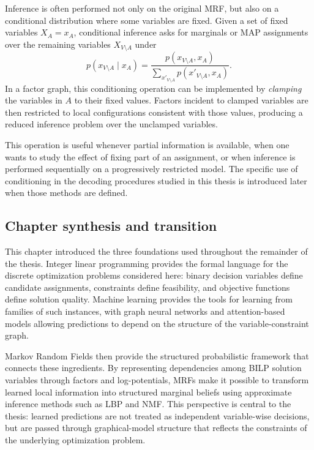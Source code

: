 Inference is often performed not only on the original MRF, but also on a conditional distribution where some variables are fixed. Given a set of fixed variables $X_A=x_A$, conditional inference asks for marginals or MAP assignments over the remaining variables $X_{V\setminus A}$ under
\begin{equation}
p(x_{V\setminus A}\mid x_A)
=
\frac{p(x_{V\setminus A},x_A)}
{\sum_{x'_{V\setminus A}}p(x'_{V\setminus A},x_A)}.
\end{equation}
In a factor graph, this conditioning operation can be implemented by \emph{clamping} the variables in $A$ to their fixed values. Factors incident to clamped variables are then restricted to local configurations consistent with those values, producing a reduced inference problem over the unclamped variables.

This operation is useful whenever partial information is available, when one wants to study the effect of fixing part of an assignment, or when inference is performed sequentially on a progressively restricted model. The specific use of conditioning in the decoding procedures studied in this thesis is introduced later when those methods are defined.

\subsection{Chapter synthesis and transition}

This chapter introduced the three foundations used throughout the remainder of the thesis. Integer linear programming provides the formal language for the discrete optimization problems considered here: binary decision variables define candidate assignments, constraints define feasibility, and objective functions define solution quality. Machine learning provides the tools for learning from families of such instances, with graph neural networks and attention-based models allowing predictions to depend on the structure of the variable-constraint graph.

Markov Random Fields then provide the structured probabilistic framework that connects these ingredients. By representing dependencies among BILP solution variables through factors and log-potentials, MRFs make it possible to transform learned local information into structured marginal beliefs using approximate inference methods such as LBP and NMF. This perspective is central to the thesis: learned predictions are not treated as independent variable-wise decisions, but are passed through graphical-model structure that reflects the constraints of the underlying optimization problem.

